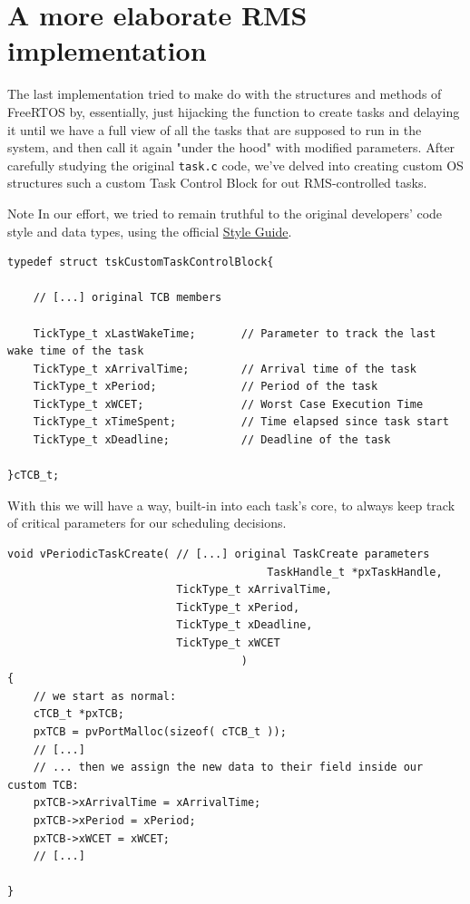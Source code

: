 \documentclass[10pt]{article}
\begin{document}
\section{A more elaborate RMS implementation}
The last implementation tried to make do with the structures and methods of FreeRTOS by, essentially, just hijacking the function to create tasks and delaying it until we have a full view of all the tasks that are supposed to run in the system, and then call it again "under the hood" with modified parameters.
After carefully studying the original \verb|task.c| code, we've delved into creating custom OS structures such a custom Task Control Block for out RMS-controlled tasks.

\begin{example}{Note}
In our effort, we tried to remain truthful to the original developers' code style and data types, using the official \href{https://www.freertos.org/FreeRTOS-Coding-Standard-and-Style-Guide.html}{Style Guide}.
\end{example}

\lstset{language=c}
\begin{lstlisting}
typedef struct tskCustomTaskControlBlock{
   
    // [...] original TCB members

    TickType_t xLastWakeTime;       // Parameter to track the last wake time of the task
    TickType_t xArrivalTime;        // Arrival time of the task
    TickType_t xPeriod;             // Period of the task
    TickType_t xWCET;               // Worst Case Execution Time
    TickType_t xTimeSpent;          // Time elapsed since task start
    TickType_t xDeadline;           // Deadline of the task

}cTCB_t;

\end{lstlisting}
With this we will have a way, built-in into each task's core, to always keep track of critical parameters for our scheduling decisions.

\lstset{language=c}
\begin{lstlisting}
void vPeriodicTaskCreate( // [...] original TaskCreate parameters
							            TaskHandle_t *pxTaskHandle,
                          TickType_t xArrivalTime,
                          TickType_t xPeriod,
                          TickType_t xDeadline,
                          TickType_t xWCET
					            	)
{
	// we start as normal:
    cTCB_t *pxTCB;
    pxTCB = pvPortMalloc(sizeof( cTCB_t ));
    // [...]
    // ... then we assign the new data to their field inside our custom TCB:
    pxTCB->xArrivalTime = xArrivalTime;
    pxTCB->xPeriod = xPeriod;
    pxTCB->xWCET = xWCET;
    // [...]

}

\end{lstlisting}
\end{document}
